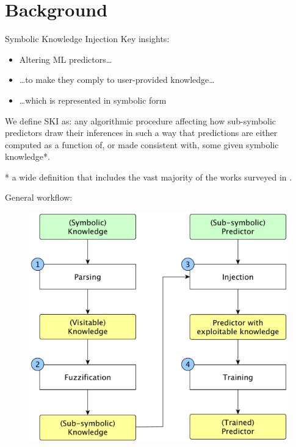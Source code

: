 \documentclass[presentation]{beamer}\mode<presentation>{\usetheme{AMSBolognaFC}}
\begin{document}
\section{Background}

\begin{frame}[allowframebreaks]{Symbolic Knowledge Injection}
    Key insights:
    \medskip
    \begin{itemize}
        \item \alert{Altering} ML predictors\ldots
        \medskip
        \item \ldots to make they \alert{comply} to user-provided knowledge\ldots
        \medskip
        \item \ldots which is represented in \alert{symbolic form}
    \end{itemize}

    \framebreak

    \begin{block}{We define SKI as:}
        any \alert{algorithmic} procedure affecting how \alert{sub-symbolic predictors} draw their inferences in such a way that predictions are either \alert{computed} as a function of, or made \alert{consistent} with, some \alert{given} \alert{symbolic knowledge}*.
    \end{block}
    \bigskip
    * a wide definition that includes the vast majority of the works surveyed in \cite{surveyNeuroSymb,surveyXie,surveyCalegariCO20}.

    \framebreak

    General workflow:
    \begin{figure}
        \centering
        \includegraphics[width=0.8\textheight]{figures/ski-workflow.pdf}
    \end{figure}
\end{frame}
\end{document}
